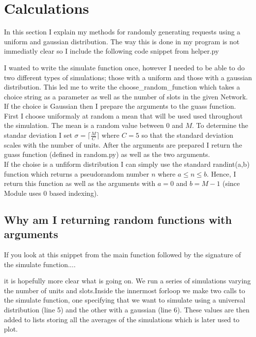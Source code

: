 \documentclass[12pt]{article}
\begin{document}
\newpage
\section*{Calculations}
In this section I explain my methods for randomly generating requests using
a uniform and gaussian distribution. The way this is done in my program
is not immediatly clear so I include the following code snippet
from helper.py



I wanted to write the simulate function once, however I needed
to be able to do two different types of simulations; those with a 
uniform and those with a gaussian distribution. This led me to write
the choose\_random\_function which takes a choice string as a parameter as 
well as the number of slots in the given Network. \\If the choice is
Gaussian then I prepare the arguments to the guass function. First
I choose uniformaly at random a mean that will be used used throughout the simulation.
The mean is a random value between $0$ and $M$. To determine the standar deviation
I set $\sigma = \lceil \frac{M}{C} \rceil$ where $C=5$ so that the 
standard deviation scales with the number of units. After the arguments are prepared
I return the guass function (defined in random.py) as well as the two arguments. \\

If the choise is a unfiform distribution I can simply use
the standard randint(a,b) function which returns a pseudorandom number $n$
where $a \leq n \leq b $. Hence, I return this function as well as the 
arguments with $a=0$ and $b=M-1$ (since Module uses 0 based indexing).\\

\subsection*{Why am I returning random functions with arguments}
If you look at this snippet from the main function followed by the signature
of the simulate function....  


it is hopefully more clear what is going on. We run a series of simulations
varying the number of units and slots.Inside the innermost forloop
we make two calls to the simulate function, one specifying that we want to simulate
using a universal distribution (line 5) and the other with a gaussian (line 6). 
These values are then added to lists storing all the averages of the simulations which is 
later used to plot. 
\end{document}
